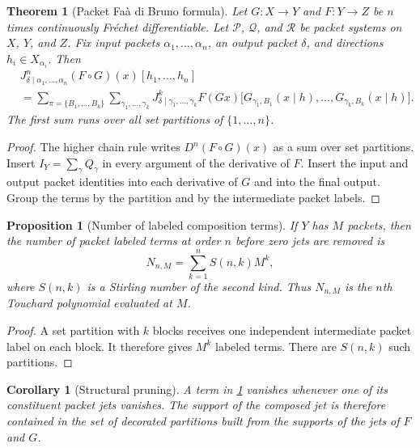 \documentclass{aomart}
\newtheorem{theorem}{Theorem}[section]
\newtheorem{proposition}[proposition]{Proposition}
\newtheorem{corollary}[corollary]{Corollary}
\theoremstyle{definition}
\theoremstyle{remark}
\newcommand{\Pcal}{\mathcal P}
\newcommand{\Qcal}{\mathcal Q}
\newcommand{\Rcal}{\mathcal R}
\begin{document}
\begin{theorem}[Packet Fa\`a di Bruno formula]\label{thm:packet_faa}
Let $G:X\to Y$ and $F:Y\to Z$ be $n$ times continuously Fr\'echet differentiable.  Let $\Pcal$, $\Qcal$, and $\Rcal$ be packet systems on $X$, $Y$, and $Z$.  Fix input packets $\alpha_1,\ldots,\alpha_n$, an output packet $\delta$, and directions $h_i\in X_{\alpha_i}$.  Then
\[
\begin{aligned}
&J^{n}_{\delta\mid\alpha_1,\ldots,\alpha_n}(F\circ G)(x)
[h_1,\ldots,h_n]\\
&=
\sum_{\pi=\{B_1,\ldots,B_k\}}
\sum_{\gamma_1,\ldots,\gamma_k}
J^{k}_{\delta\mid\gamma_1,\ldots,\gamma_k}F(Gx)
\big[
G_{\gamma_1,B_1}(x\mid h),\ldots,
G_{\gamma_k,B_k}(x\mid h)
\big].
\end{aligned}
\]
The first sum runs over all set partitions of $\{1,\ldots,n\}$.
\end{theorem}

\begin{proof}
The higher chain rule writes $D^n(F\circ G)(x)$ as a sum over set partitions.  Insert $I_Y=\sum_\gamma Q_\gamma$ in every argument of the derivative of $F$.  Insert the input and output packet identities into each derivative of $G$ and into the final output.  Group the terms by the partition and by the intermediate packet labels.
\end{proof}

\begin{proposition}[Number of labeled composition terms]\label{prop:faa_term_count}
If $Y$ has $M$ packets, then the number of packet labeled terms at order $n$ before zero jets are removed is
\[
N_{n,M}
=
\sum_{k=1}^{n}S(n,k)M^k,
\]
where $S(n,k)$ is a Stirling number of the second kind.  Thus $N_{n,M}$ is the $n$th Touchard polynomial evaluated at $M$.
\end{proposition}

\begin{proof}
A set partition with $k$ blocks receives one independent intermediate packet label on each block.  It therefore gives $M^k$ labeled terms.  There are $S(n,k)$ such partitions.
\end{proof}

\begin{corollary}[Structural pruning]\label{cor:structural_pruning}
A term in \cref{thm:packet_faa} vanishes whenever one of its constituent packet jets vanishes.  The support of the composed jet is therefore contained in the set of decorated partitions built from the supports of the jets of $F$ and $G$.
\end{corollary}
\end{document}
